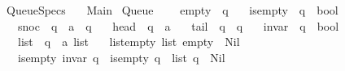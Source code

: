 %
\begin{isabellebody}%
%
%
\isadelimtheory
%
\endisadelimtheory
%
\isatagtheory
{}\isamarkupfalse%
\ Queue{\isacharunderscore}{\kern0pt}Specs\isanewline
\ \ \ Main\isanewline
{}%
\endisatagtheory
{\isafoldtheory}%
%
\isadelimtheory
\isanewline
%
\endisadelimtheory
\isanewline
{}\isamarkupfalse%
\ Queue\ {\isacharequal}{\kern0pt}\isanewline
\ \ \ empty\ {\isacharcolon}{\kern0pt}{\isacharcolon}{\kern0pt}\ {\isachardoublequoteopen}{\isacharprime}{\kern0pt}q{\isachardoublequoteclose}\isanewline
\ \ \ is{\isacharunderscore}{\kern0pt}empty\ {\isacharcolon}{\kern0pt}{\isacharcolon}{\kern0pt}\ {\isachardoublequoteopen}{\isacharprime}{\kern0pt}q\ {\isasymRightarrow}\ bool{\isachardoublequoteclose}\isanewline
\ \ \ snoc\ {\isacharcolon}{\kern0pt}{\isacharcolon}{\kern0pt}\ {\isachardoublequoteopen}{\isacharprime}{\kern0pt}q\ {\isasymRightarrow}\ {\isacharprime}{\kern0pt}a\ {\isasymRightarrow}\ {\isacharprime}{\kern0pt}q{\isachardoublequoteclose}\isanewline
\ \ \ head\ {\isacharcolon}{\kern0pt}{\isacharcolon}{\kern0pt}\ {\isachardoublequoteopen}{\isacharprime}{\kern0pt}q\ {\isasymRightarrow}\ {\isacharprime}{\kern0pt}a{\isachardoublequoteclose}\isanewline
\ \ \ tail\ {\isacharcolon}{\kern0pt}{\isacharcolon}{\kern0pt}\ {\isachardoublequoteopen}{\isacharprime}{\kern0pt}q\ {\isasymRightarrow}\ {\isacharprime}{\kern0pt}q{\isachardoublequoteclose}\isanewline
\ \ \ invar\ {\isacharcolon}{\kern0pt}{\isacharcolon}{\kern0pt}\ {\isachardoublequoteopen}{\isacharprime}{\kern0pt}q\ {\isasymRightarrow}\ bool{\isachardoublequoteclose}\isanewline
\ \ \ list\ {\isacharcolon}{\kern0pt}{\isacharcolon}{\kern0pt}\ {\isachardoublequoteopen}{\isacharprime}{\kern0pt}q\ {\isasymRightarrow}\ {\isacharprime}{\kern0pt}a\ list{\isachardoublequoteclose}\isanewline
\ \ \ list{\isacharunderscore}{\kern0pt}empty{\isacharcolon}{\kern0pt}\ {\isachardoublequoteopen}list\ empty\ {\isacharequal}{\kern0pt}\ Nil{\isachardoublequoteclose}\isanewline
\ \ \ is{\isacharunderscore}{\kern0pt}empty{\isacharcolon}{\kern0pt}\ {\isachardoublequoteopen}invar\ q\ {\isasymLongrightarrow}\ is{\isacharunderscore}{\kern0pt}empty\ q\ {\isacharequal}{\kern0pt}\ {\isacharparenleft}{\kern0pt}list\ q\ {\isacharequal}{\kern0pt}\ Nil{\isacharparenright}{\kern0pt}{\isachardoublequoteclose}\isanewline

\end{isabellebody}
